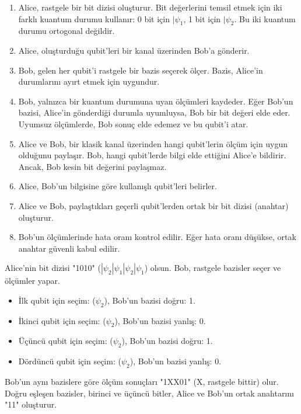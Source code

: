 \begin{enumerate}
    \item Alice, rastgele bir bit dizisi oluşturur. Bit değerlerini temsil etmek için iki farklı kuantum durumu kullanır: 0 bit için $|\psi_1$, 1 bit için $|\psi_2$. Bu iki kuantum durumu ortogonal değildir.
    \item Alice, oluşturduğu qubit'leri bir kanal üzerinden Bob'a gönderir.
    \item Bob, gelen her qubit'i rastgele bir bazis seçerek ölçer. Bazis, Alice'in durumlarını ayırt etmek için uygundur.
    \item Bob, yalnızca bir kuantum durumuna uyan ölçümleri kaydeder. Eğer Bob'un bazisi, Alice'in gönderdiği durumla uyumluysa, Bob bir bit değeri elde eder. Uyumsuz ölçümlerde, Bob sonuç elde edemez ve bu qubit'i atar.
    \item Alice ve Bob, bir klasik kanal üzerinden hangi qubit'lerin ölçüm için uygun olduğunu paylaşır. Bob, hangi qubit'lerde bilgi elde ettiğini Alice'e bildirir. Ancak, Bob kesin bit değerini paylaşmaz.
    \item Alice, Bob'un bilgisine göre kullanışlı qubit'leri belirler.
    \item Alice ve Bob, paylaştıkları geçerli qubit'lerden ortak bir bit dizisi (anahtar) oluşturur.
    \item Bob'un ölçümlerinde hata oranı kontrol edilir. Eğer hata oranı düşükse, ortak anahtar güvenli kabul edilir.
\end{enumerate}

Alice'nin bit dizisi "1010" ($|\psi_2 |\psi_1 |\psi_2 |\psi_1$) olsun. Bob, rastgele bazisler seçer ve ölçümler yapar.

\begin{itemize}
    \item İlk qubit için seçim: ($\psi_2$), Bob'un bazisi doğru: 1.
    \item İkinci qubit için seçim: ($\psi_2$), Bob'un bazisi yanlış: 0.
    \item Üçüncü qubit için seçim: ($\psi_2$), Bob'un bazisi doğru: 1.
    \item Dördüncü qubit için seçim: ($\psi_2$), Bob'un bazisi yanlış: 0.
\end{itemize}

Bob'un aynı bazislere göre ölçüm sonuçları "1XX01" (X, rastgele bittir) olur. Doğru eşleşen bazisler, birinci ve üçüncü bitler, Alice ve Bob'un ortak anahtarını "11" oluşturur.

\newpage

